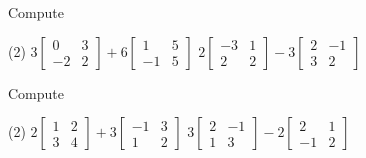 \begin{exercise}
Compute
\begin{tasks}(2)
\task
$3\begin{bmatrix}
0 & 3 \\
-2 & 2
\end{bmatrix}
+
6
\begin{bmatrix}
1 & 5 \\
-1 & 5
\end{bmatrix}$
\task
$2\begin{bmatrix}
-3 & 1 \\
2 & 2
\end{bmatrix}
-
3
\begin{bmatrix}
2 & -1 \\
3 & 2
\end{bmatrix}$
\end{tasks}
\end{exercise}


\begin{exercise}\ansMark%
Compute
\begin{tasks}(2)
\task
$2\begin{bmatrix}
1 & 2 \\
3 & 4
\end{bmatrix}
+
3
\begin{bmatrix}
-1 & 3 \\
1 & 2
\end{bmatrix}$
\task
$3\begin{bmatrix}
2 & -1 \\
1 & 3
\end{bmatrix}
-
2
\begin{bmatrix}
2 & 1 \\
-1 & 2
\end{bmatrix}$
\end{tasks}
\end{exercise}

